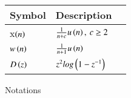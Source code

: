 \centering
\setlength{\arrayrulewidth}{0.3mm}
\setlength{\tabcolsep}{15pt}
\renewcommand{\arraystretch}{1.5}
\begin{tabular}{ |p{1cm}|p{2cm}|p{2cm}| }
\hline
Symbol & Description \\
\hline
x$\left(n\right)$ &  $\frac{1}{n+c} u\left(n\right), \: c \geq 2$ \\
\hline
$w\left(n\right)$ &  $\frac{1}{n+1} u\left(n\right)$ \\
\hline
$D\left(z\right)$ & $z^2 log\left(1-z^{-1}\right)$\\
\hline
\end{tabular}
\caption{Notations}
